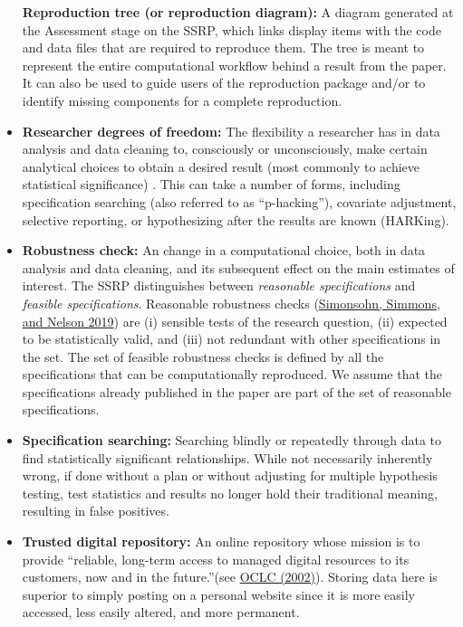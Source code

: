 \documentclass[
  openany]{book}
\begin{document}
\begin{itemize}
  \textbf{Reproduction tree (or reproduction diagram):} A diagram generated at the Assessment stage on the SSRP, which links display items with the code and data files that are required to reproduce them. The tree is meant to represent the entire computational workflow behind a result from the paper. It can also be used to guide users of the reproduction package and/or to identify missing components for a complete reproduction.
\item
  \textbf{Researcher degrees of freedom:} The flexibility a researcher has in data analysis and data cleaning to, consciously or unconsciously, make certain analytical choices to obtain a desired result (most commonly to achieve statistical significance) . This can take a number of forms, including specification searching (also referred to as ``p-hacking''), covariate adjustment, selective reporting, or hypothesizing after the results are known (HARKing).
\item
  \textbf{Robustness check:} An change in a computational choice, both in data analysis and data cleaning, and its subsequent effect on the main estimates of interest. The SSRP distinguishes between \emph{reasonable specifications} and \emph{feasible specifications}. Reasonable robustness checks (\protect\hyperlink{ref-simonsohn2019specification}{Simonsohn, Simmons, and Nelson 2019}) are (i) sensible tests of the research question, (ii) expected to be statistically valid, and (iii) not redundant with other specifications in the set. The set of feasible robustness checks is defined by all the specifications that can be computationally reproduced. We assume that the specifications already published in the paper are part of the set of reasonable specifications.
\item
  \textbf{Specification searching:} Searching blindly or repeatedly through data to find statistically significant relationships. While not necessarily inherently wrong, if done without a plan or without adjusting for multiple hypothesis testing, test statistics and results no longer hold their traditional meaning, resulting in false positives.
\item
  \textbf{Trusted digital repository:} An online repository whose mission is to provide ``reliable, long-term access to managed digital resources to its customers, now and in the future.''(see \href{https://www.oclc.org/research/archive/projects/trustedrep.html}{OCLC (2002)}). Storing data here is superior to simply posting on a personal website since it is more easily accessed, less easily altered, and more permanent.
\end{itemize}
\end{document}
